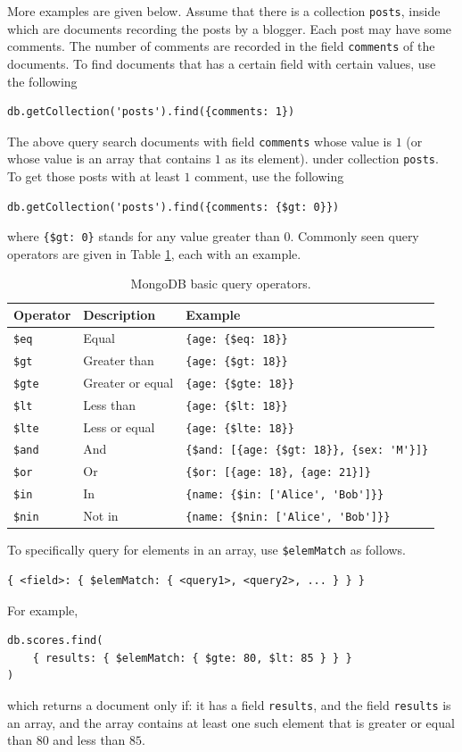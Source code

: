 More examples are given below. Assume that there is a collection \verb|posts|, inside which are documents recording the posts by a blogger. Each post may have some comments. The number of comments are recorded in the field \verb|comments| of the documents. To find documents that has a certain field with certain values, use the following
\begin{lstlisting}
db.getCollection('posts').find({comments: 1})
\end{lstlisting}
The above query search documents with field \verb|comments| whose value is $1$ (or whose value is an array that contains $1$ as its element). under collection \verb|posts|. To get those posts with at least $1$ comment, use the following
\begin{lstlisting}
db.getCollection('posts').find({comments: {$gt: 0}})
\end{lstlisting}
where \verb|{$gt: 0}| stands for any value greater than $0$. Commonly seen query operators are given in Table \ref{ch:db:tab:mongodbqueryoperator}, each with an example.

\begin{table}
	\centering \caption{MongoDB basic query operators.} \label{ch:db:tab:mongodbqueryoperator}
	\begin{tabularx}{\textwidth}{llX}
		\hline
		Operator & Description & Example \\ \hline
		\verb|$eq| & Equal & \verb|{age: {$eq: 18}}| \\ 
		\verb|$gt| & Greater than & \verb|{age: {$gt: 18}}| \\ 
		\verb|$gte| & Greater or equal & \verb|{age: {$gte: 18}}| \\ 
		\verb|$lt| & Less than & \verb|{age: {$lt: 18}}| \\ 
		\verb|$lte| & Less or equal & \verb|{age: {$lte: 18}}| \\ 
		\verb|$and| & And & \verb|{$and: [{age: {$gt: 18}}, {sex: 'M'}]}| \\ 
		\verb|$or| & Or &  \verb|{$or: [{age: 18}, {age: 21}]}| \\ 
		\verb|$in| & In & \verb|{name: {$in: ['Alice', 'Bob']}}| \\ 
		\verb|$nin| & Not in & \verb|{name: {$nin: ['Alice', 'Bob']}}| \\
		\hline
	\end{tabularx}
\end{table}

To specifically query for elements in an array, use \verb|$elemMatch| as follows.
\begin{lstlisting}
{ <field>: { $elemMatch: { <query1>, <query2>, ... } } }
\end{lstlisting}
For example,
\begin{lstlisting}
db.scores.find(
	{ results: { $elemMatch: { $gte: 80, $lt: 85 } } }
)
\end{lstlisting}
which returns a document only if: it has a field \verb|results|, and the field \verb|results| is an array, and the array contains at least one such element that is greater or equal than $80$ and less than $85$.

